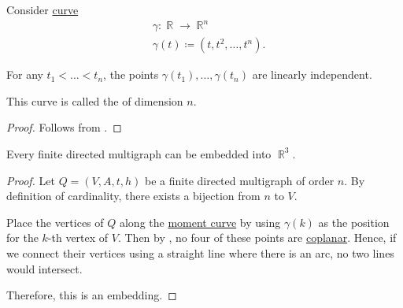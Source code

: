 \begin{proposition}\label{thm:moment_curve}
  Consider \hyperref[def:parametric_curve]{curve}
  \begin{equation*}
    \begin{aligned}
      &\gamma: \BbbR \to \BbbR^n \\
      &\gamma(t) \coloneqq (t, t^2, \ldots, t^n).
    \end{aligned}
  \end{equation*}

  For any \( t_1 < \ldots < t_n \), the points \( \gamma(t_1), \ldots, \gamma(t_n) \) are linearly independent.

  This curve is called the  of dimension \( n \).
\end{proposition}
\begin{proof}
  Follows from .
\end{proof}

\begin{proposition}\label{thm:directed multigraph_can_be_embedded_into_r3}
  Every finite directed multigraph can be embedded into \( \BbbR^3 \).
\end{proposition}
\begin{proof}
  Let \( Q = (V, A, t, h) \) be a finite directed multigraph of order \( n \). By definition of cardinality, there exists a bijection from \( n \) to \( V \).

  Place the vertices of \( Q \) along the \hyperref[thm:moment_curve]{moment curve} by using \( \gamma(k) \) as the position for the \( k \)-th vertex of \( V \). Then by , no four of these points are \hyperref[def:coplanar_points]{coplanar}. Hence, if we connect their vertices using a straight line where there is an arc, no two lines would intersect.

  Therefore, this is an embedding.
\end{proof}

